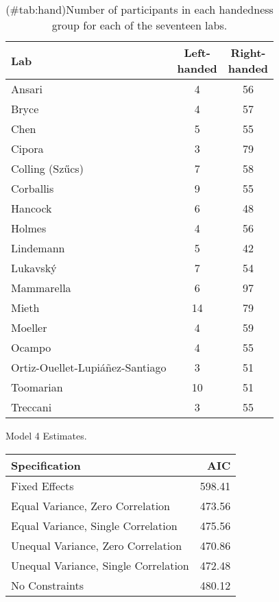 \begin{appendix}
\begin{table}

\caption{(\#tab:hand)Number of participants in each handedness group for each of the seventeen labs.}
\centering
\begin{tabular}[t]{lcc}
\toprule
Lab & \makecell[c]{Left-\\handed} & \makecell[c]{Right-\\handed}\\
\midrule
Ansari & 4 & 56\\
Bryce & 4 & 57\\
Chen & 5 & 55\\
Cipora & 3 & 79\\
Colling (Szűcs) & 7 & 58\\
Corballis & 9 & 55\\
Hancock & 6 & 48\\
Holmes & 4 & 56\\
Lindemann & 5 & 42\\
Lukavský & 7 & 54\\
Mammarella & 6 & 97\\
Mieth & 14 & 79\\
Moeller & 4 & 59\\
Ocampo & 4 & 55\\
Ortiz-Ouellet-Lupiáñez-Santiago & 3 & 51\\
Toomarian & 10 & 51\\
Treccani & 3 & 55\\
\bottomrule
\end{tabular}
\end{table}

\begin{table}[!p]
\caption{\label{tab:mod4}Model 4 Estimates.}
\begin{subtable}{\textwidth}
\centering
\begin{table}[H]\centering\begingroup\fontsize{10}{12}\selectfont

\begin{tabular}{lr}
\toprule
Specification & AIC\\
\midrule
Fixed Effects & 598.41\\
Equal Variance, Zero Correlation & 473.56\\
Equal Variance, Single Correlation & 475.56\\
Unequal Variance, Zero Correlation & 470.86\\
Unequal Variance, Single Correlation & 472.48\\
No Constraints & 480.12\\
\bottomrule
\end{tabular}\endgroup{}
\end{table}
\end{subtable}
\begin{subtable}{\textwidth}
\caption{Fixed Effect Estimates}
\centering
\begin{table}[H]\centering\begingroup\fontsize{10}{12}\selectfont


\end{table}
\end{subtable}
\end{table}
\end{appendix}
